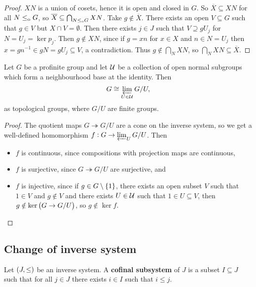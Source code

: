 \begin{proof}
$ XN $ is a union of cosets, hence it is open and closed in $ G $. So $ \overline{X} \subseteq XN $ for all $ N \le_{\mathrm{o}} G $, so $ \overline{X} \subseteq \bigcap_{N \le_{\mathrm{o}} G} XN $. Take $ g \notin \overline{X} $. There exists an open $ V \subseteq G $ such that $ g \in V $ but $ X \cap V = \emptyset $. Then there exists $ j \in J $ such that $ V \supseteq gU_j $ for $ N = U_j = \ker p_j $. Then $ g \notin XN $, since if $ g = xn $ for $ x \in X $ and $ n \in N = U_j $ then $ x = gn^{-1} \in gN = gU_j \subseteq V $, a contradiction. Thus $ g \notin \bigcap_N XN $, so $ \bigcap_N XN \subseteq \overline{X} $.
\end{proof}

\begin{proposition}
\label{prop:1.2.33}
Let $ G $ be a profinite group and let $ \mathcal{U} $ be a collection of open normal subgroups which form a neighbourhood base at the identity. Then
$$ G \cong \varprojlim_{U \in \mathcal{U}} G / U, $$
as topological groups, where $ G / U $ are finite groups.
\end{proposition}

\pagebreak

\begin{proof}
The quotient maps $ G \twoheadrightarrow G / U $ are a cone on the inverse system, so we get a well-defined homomorphism $ f : G \to \varprojlim_U G / U $. Then
\begin{itemize}
\item $ f $ is continuous, since compositions with projection maps are continuous,
\item $ f $ is surjective, since $ G \twoheadrightarrow G / U $ are surjective, and
\item $ f $ is injective, since if $ g \in G \setminus \cbr{1} $, there exists an open subset $ V $ such that $ 1 \in V $ and $ g \notin V $ and there exists $ U \in \mathcal{U} $ such that $ 1 \in U \subseteq V $, then $ g \notin \ker \br{G \to G / U} $, so $ g \notin \ker f $.
\end{itemize}
\end{proof}

\subsection{Change of inverse system}

\begin{definition}
Let $ \br{J, \le} $ be an inverse system. A \textbf{cofinal subsystem} of $ J $ is a subset $ I \subseteq J $ such that for all $ j \in J $ there exists $ i \in I $ such that $ i \le j $.
\end{definition}


